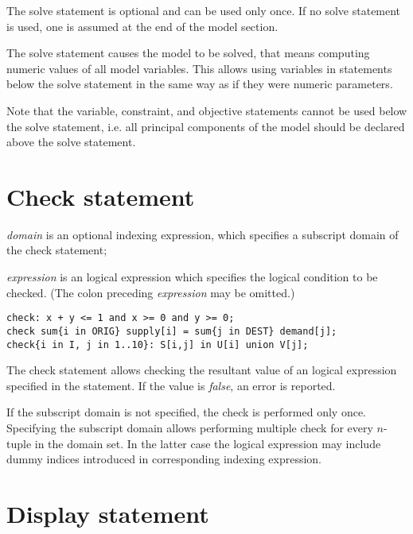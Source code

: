\documentclass[11pt]{report}
\def\para#1{\noindent{\bf#1}}
\begin{document}
\medskip

The solve statement is optional and can be used only once. If no solve
statement is used, one is assumed at the end of the model section.

The solve statement causes the model to be solved, that means computing
numeric values of all model variables. This allows using variables in
statements below the solve statement in the same way as if they were
numeric parameters.

Note that the variable, constraint, and objective statements cannot be
used below the solve statement, i.e. all principal components of the
model should be declared above the solve statement.

\newpage

\section{Check statement}

\noindent
{}

\medskip

\noindent
{\it domain} is an optional indexing expression, which specifies
a subscript domain of the check statement;

\noindent
{\it expression} is an logical expression which specifies the logical
condition to be checked. (The colon preceding {\it expression} may be
omitted.)

\para{Examples}

\begin{verbatim}
check: x + y <= 1 and x >= 0 and y >= 0;
check sum{i in ORIG} supply[i] = sum{j in DEST} demand[j];
check{i in I, j in 1..10}: S[i,j] in U[i] union V[j];
\end{verbatim}

The check statement allows checking the resultant value of an logical
expression specified in the statement. If the value is {\it false}, an
error is reported.

If the subscript domain is not specified, the check is performed only
once. Specifying the subscript domain allows performing multiple check
for every $n$-tuple in the domain set. In the latter case the logical
expression may include dummy indices introduced in corresponding
indexing expression.

\section{Display statement}
\end{document}
